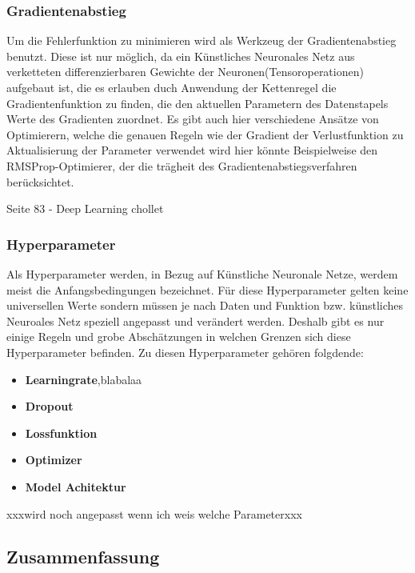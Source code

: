 \subsubsection{Gradientenabstieg}
Um die Fehlerfunktion zu minimieren wird als Werkzeug der Gradientenabstieg benutzt. Diese ist nur möglich, da ein Künstliches Neuronales Netz aus verketteten differenzierbaren Gewichte der Neuronen(Tensoroperationen) aufgebaut ist, die es erlauben duch Anwendung der Kettenregel die Gradientenfunktion zu finden, die den aktuellen Parametern des Datenstapels Werte des Gradienten zuordnet. Es gibt auch hier verschiedene Ansätze von Optimierern, welche die genauen Regeln wie der Gradient der Verlustfunktion zu Aktualisierung der Parameter verwendet wird hier könnte Beispielweise den RMSProp-Optimierer, der die trägheit des Gradientenabstiegsverfahren berücksichtet.

Seite 83 - Deep Learning chollet


\subsubsection{Hyperparameter}
Als Hyperparameter werden, in Bezug auf Künstliche Neuronale Netze, werdem meist die Anfangsbedingungen bezeichnet. 
Für diese Hyperparameter gelten keine universellen Werte sondern müssen je nach Daten und Funktion bzw. künstliches Neuroales Netz speziell angepasst und verändert werden. Deshalb gibt es nur einige Regeln und grobe Abschätzungen in welchen Grenzen sich diese Hyperparameter befinden. Zu diesen Hyperparameter gehören folgdende:
\begin{itemize}
\item \textbf{Learningrate},blabalaa
\item \textbf{Dropout}
\item \textbf{Lossfunktion}
\item \textbf{Optimizer}
\item \textbf{Model Achitektur}
\end{itemize}

xxxwird noch angepasst wenn ich weis welche Parameterxxx

\subsection{Zusammenfassung}


